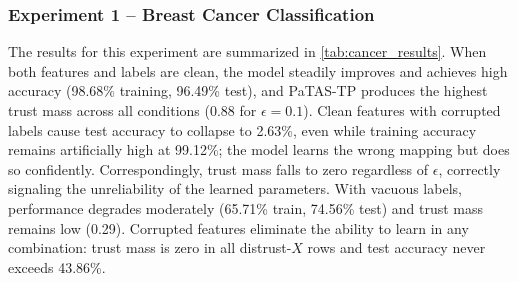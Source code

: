 \subsubsection*{Experiment 1 -- Breast Cancer Classification}
\begin{table}[ht]
\caption{Summary of final trust mass across four values of $\epsilon$ and corresponding train/test accuracies for the Breast Cancer Classification Experiment (original prototype, one run per cell; a five-seed replication with the released implementation is given in \cref{tab:cancer_seeds}).}
\label{tab:cancer_results}
\end{table}

The results for this experiment are summarized in \cref{tab:cancer_results}. When both features and labels are clean, the model steadily improves and achieves high accuracy (98.68\% training, 96.49\% test), and \ac{PaTAS-TP} produces the highest trust mass across all conditions (0.88 for $\epsilon=0.1$). Clean features with corrupted labels cause test accuracy to collapse to 2.63\%, even while training accuracy remains artificially high at 99.12\%; the model learns the wrong mapping but does so confidently. Correspondingly, trust mass falls to zero regardless of $\epsilon$, correctly signaling the unreliability of the learned parameters. With vacuous labels, performance degrades moderately (65.71\% train, 74.56\% test) and trust mass remains low (0.29). Corrupted features eliminate the ability to learn in any combination: trust mass is zero in all distrust-$X$ rows and test accuracy never exceeds 43.86\%. 

